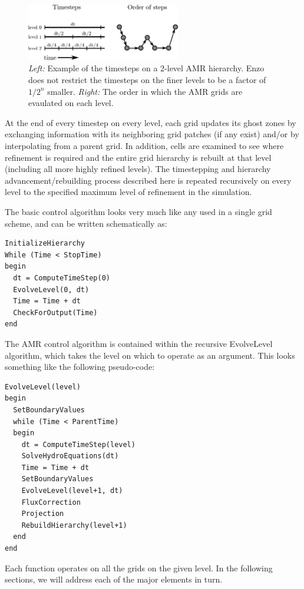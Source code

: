 \begin{figure}
\begin{center}
\includegraphics[width=0.6\textwidth]{figures/timestepping.eps}
\end{center}
\caption{\emph{Left:} Example of the timesteps on a 2-level AMR
  hierarchy.  Enzo does not restrict the timesteps on the finer levels
  to be a factor of $1/2^n$ smaller.  \emph{Right:} The order in which
  the AMR grids are evaulated on each level.}
\label{fig:wcycle}
\end{figure}

At the end of every timestep on every level, each grid updates its ghost zones by exchanging information with its neighboring grid patches (if any exist) and/or by interpolating from a parent grid.  In addition, cells are examined to see where refinement is required and the entire grid hierarchy is rebuilt at that level (including all more highly refined levels).  The timestepping and hierarchy advancement/rebuilding process described here is repeated recursively on every level to the specified maximum level of refinement in the simulation. 


The basic control algorithm looks very much like any used in a single
grid scheme, and can be written schematically as:
\begin{verbatim}
InitializeHierarchy
While (Time < StopTime)
begin
  dt = ComputeTimeStep(0)
  EvolveLevel(0, dt)
  Time = Time + dt
  CheckForOutput(Time)
end
\end{verbatim}
The AMR control algorithm is contained within the recursive
EvolveLevel algorithm, which takes the level on which to operate as an
argument.  This looks something like the following pseudo-code:
\begin{verbatim}
EvolveLevel(level)
begin
  SetBoundaryValues
  while (Time < ParentTime)
  begin
    dt = ComputeTimeStep(level)
    SolveHydroEquations(dt)
    Time = Time + dt
    SetBoundaryValues
    EvolveLevel(level+1, dt)
    FluxCorrection
    Projection
    RebuildHierarchy(level+1)
  end
end
\end{verbatim}

Each function operates on all the grids on the given level.  In the following sections, we will address each of the major elements in turn.

